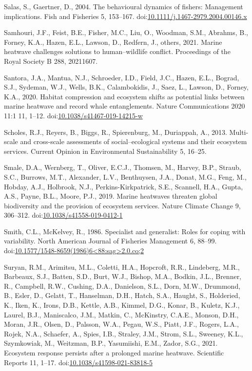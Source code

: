 \documentclass[]{elsarticle} %
\begin{document}
\leavevmode\hypertarget{ref-Salas2004}{}%
Salas, S., Gaertner, D., 2004. The behavioural dynamics of fishers:
Management implications. Fish and Fisheries 5, 153--167.
doi:\href{https://doi.org/10.1111/j.1467-2979.2004.00146.x}{10.1111/j.1467-2979.2004.00146.x}

\leavevmode\hypertarget{ref-Samhouri2021}{}%
Samhouri, J.F., Feist, B.E., Fisher, M.C., Liu, O., Woodman, S.M.,
Abrahms, B., Forney, K.A., Hazen, E.L., Lawson, D., Redfern, J., others,
2021. Marine heatwave challenges solutions to human--wildlife conflict.
Proceedings of the Royal Society B 288, 20211607.

\leavevmode\hypertarget{ref-Santora2020}{}%
Santora, J.A., Mantua, N.J., Schroeder, I.D., Field, J.C., Hazen, E.L.,
Bograd, S.J., Sydeman, W.J., Wells, B.K., Calambokidis, J., Saez, L.,
Lawson, D., Forney, K.A., 2020. Habitat compression and ecosystem shifts
as potential links between marine heatwave and record whale
entanglements. Nature Communications 2020 11:1 11, 1--12.
doi:\href{https://doi.org/10.1038/s41467-019-14215-w}{10.1038/s41467-019-14215-w}

\leavevmode\hypertarget{ref-Scholes2013}{}%
Scholes, R.J., Reyers, B., Biggs, R., Spierenburg, M., Duriappah, A.,
2013. Multi-scale and cross-scale assessments of social--ecological
systems and their ecosystem services. Current Opinion in Environmental
Sustainability 5, 16--25.

\leavevmode\hypertarget{ref-Smale2019}{}%
Smale, D.A., Wernberg, T., Oliver, E.C.J., Thomsen, M., Harvey, B.P.,
Straub, S.C., Burrows, M.T., Alexander, L.V., Benthuysen, J.A., Donat,
M.G., Feng, M., Hobday, A.J., Holbrook, N.J., Perkins-Kirkpatrick, S.E.,
Scannell, H.A., Gupta, A.S., Payne, B.L., Moore, P.J., 2019. Marine
heatwaves threaten global biodiversity and the provision of ecosystem
services. Nature Climate Change 9, 306--312.
doi:\href{https://doi.org/10.1038/s41558-019-0412-1}{10.1038/s41558-019-0412-1}

\leavevmode\hypertarget{ref-Smith1986}{}%
Smith, C.L., McKelvey, R., 1986. Specialist and generalist: Roles for
coping with variability. North American Journal of Fisheries Management
6, 88--99.
doi:\href{https://doi.org/10.1577/1548-8659(1986)6\%3C88:sag\%3E2.0.co;2}{10.1577/1548-8659(1986)6\textless88:sag\textgreater2.0.co;2}

\leavevmode\hypertarget{ref-Suryan2021}{}%
Suryan, R.M., Arimitsu, M.L., Coletti, H.A., Hopcroft, R.R., Lindeberg,
M.R., Barbeaux, S.J., Batten, S.D., Burt, W.J., Bishop, M.A., Bodkin,
J.L., Brenner, R., Campbell, R.W., Cushing, D.A., Danielson, S.L., Dorn,
M.W., Drummond, B., Esler, D., Gelatt, T., Hanselman, D.H., Hatch, S.A.,
Haught, S., Holderied, K., Iken, K., Irons, D.B., Kettle, A.B., Kimmel,
D.G., Konar, B., Kuletz, K.J., Laurel, B.J., Maniscalco, J.M., Matkin,
C., McKinstry, C.A.E., Monson, D.H., Moran, J.R., Olsen, D., Palsson,
W.A., Pegau, W.S., Piatt, J.F., Rogers, L.A., Rojek, N.A., Schaefer, A.,
Spies, I.B., Straley, J.M., Strom, S.L., Sweeney, K.L., Szymkowiak, M.,
Weitzman, B.P., Yasumiishi, E.M., Zador, S.G., 2021. Ecosystem response
persists after a prolonged marine heatwave. Scientific Reports 11,
1--17.
doi:\href{https://doi.org/10.1038/s41598-021-83818-5}{10.1038/s41598-021-83818-5}
\end{document}
